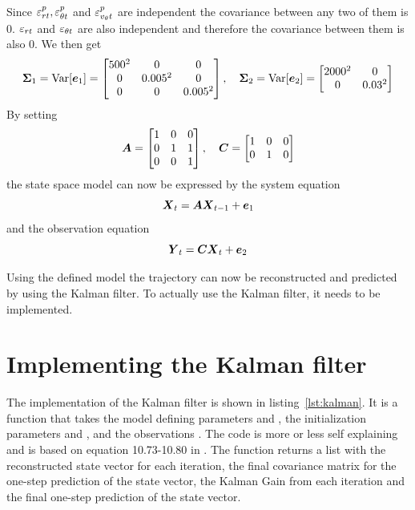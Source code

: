 Since $\varepsilon^p_{rt},\varepsilon^p_{\theta t}$ and $\varepsilon^p_{v_\theta t}$ are independent the covariance between any two of them is 0. $\varepsilon_{rt}$ and $\varepsilon_{\theta t}$ are also independent and therefore the covariance between them is also 0. We then get
\begin{equation*}
    \boldsymbol{\Sigma}_1 = \text{Var}[\boldsymbol{e}_1] = \begin{bmatrix}
        500^2 & 0 & 0 \\
        0 & 0.005^2 & 0 \\
        0 & 0 & 0.005^2
    \end{bmatrix}, \quad \boldsymbol{\Sigma}_2 = \text{Var}[\boldsymbol{e}_2] = \begin{bmatrix}
        2000^2 & 0 \\
        0 & 0.03^2
    \end{bmatrix}
\end{equation*}
By setting
\begin{equation*}
    \boldsymbol{A} = \begin{bmatrix}
        1 & 0 & 0 \\
        0 & 1 & 1 \\
        0 & 0 & 1
    \end{bmatrix}, \quad \boldsymbol{C} = \begin{bmatrix}
        1 & 0 & 0 \\
        0 & 1 & 0
    \end{bmatrix}
\end{equation*}
the state space model can now be expressed by the system equation
\begin{equation*}
    \boldsymbol{X}_t = \boldsymbol{A}\boldsymbol{X}_{t-1} + \boldsymbol{e}_1
\end{equation*}
and the observation equation
\begin{equation*}
    \boldsymbol{Y}_t = \boldsymbol{C}\boldsymbol{X}_t + \boldsymbol{e}_2
\end{equation*}

Using the defined model the trajectory can now be reconstructed and predicted by using the Kalman filter. To actually use the Kalman filter, it needs to be implemented.

\section*{Implementing the Kalman filter}
The implementation of the Kalman filter is shown in listing~\ref{lst:kalman}. It is a function that takes the model defining parameters  and , the initialization parameters  and , and the observations . The code is more or less self explaining and is based on equation 10.73-10.80 in \cite{hm}. The function returns a list with the reconstructed state vector for each iteration, the final covariance matrix for the one-step prediction of the state vector, the Kalman Gain from each iteration and the final one-step prediction of the state vector. 

